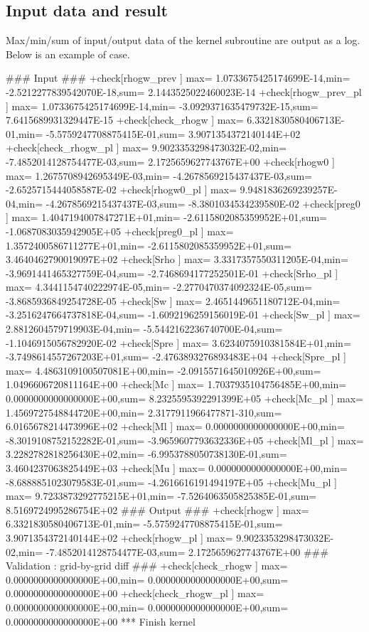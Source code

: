 \subsection{Input data and result}

Max/min/sum of input/output data of the kernel subroutine are output as
a log.
%
Below is an example of  case.


\begin{LstLog}
 ### Input ###
 +check[rhogw_prev      ] max=  1.0733675425174699E-14,min= -2.5212277839542070E-18,sum=  2.1443525022460023E-14
 +check[rhogw_prev_pl   ] max=  1.0733675425174699E-14,min= -3.0929371635479732E-15,sum=  7.6415689931329447E-15
 +check[check_rhogw     ] max=  6.3321830580406713E-01,min= -5.5759247708875415E-01,sum=  3.9071354372140144E+02
 +check[check_rhogw_pl  ] max=  9.9023353298473032E-02,min= -7.4852014128754477E-03,sum=  2.1725659627743767E+00
 +check[rhogw0          ] max=  1.2675708942695349E-03,min= -4.2678569215437437E-03,sum= -2.6525715444058587E-02
 +check[rhogw0_pl       ] max=  9.9481836269239257E-04,min= -4.2678569215437437E-03,sum= -8.3801034534239580E-02
 +check[preg0           ] max=  1.4047194007847271E+01,min= -2.6115802085359952E+01,sum= -1.0687083035942905E+05
 +check[preg0_pl        ] max=  1.3572400586711277E+01,min= -2.6115802085359952E+01,sum=  3.4640462790019097E+02
 +check[Srho            ] max=  3.3317357550311205E-04,min= -3.9691441465327759E-04,sum= -2.7468694177252501E-01
 +check[Srho_pl         ] max=  4.3441154740222974E-05,min= -2.2770470374092324E-05,sum= -3.8685936849254728E-05
 +check[Sw              ] max=  2.4651449651180712E-04,min= -3.2516247664737818E-04,sum= -1.6092196259156019E-01
 +check[Sw_pl           ] max=  2.8812604579719903E-04,min= -5.5442162236740700E-04,sum= -1.1046915056782920E-02
 +check[Spre            ] max=  3.6234075910381584E+01,min= -3.7498614557267203E+01,sum= -2.4763893276893483E+04
 +check[Spre_pl         ] max=  4.4863109100507081E+00,min= -2.0915571645010926E+00,sum=  1.0496606720811164E+00
 +check[Mc              ] max=  1.7037935104756485E+00,min=  0.0000000000000000E+00,sum=  8.2325595392291399E+05
 +check[Mc_pl           ] max=  1.4569727548844720E+00,min=  2.3177911966477871-310,sum=  6.0165678214473996E+02
 +check[Ml              ] max=  0.0000000000000000E+00,min= -8.3019108752152282E-01,sum= -3.9659607793632336E+05
 +check[Ml_pl           ] max=  3.2282782818256430E+02,min= -6.9953788050738130E-01,sum=  3.4604237063825449E+03
 +check[Mu              ] max=  0.0000000000000000E+00,min= -8.6888851023079583E-01,sum= -4.2616616191494197E+05
 +check[Mu_pl           ] max=  9.7233873292775215E+01,min= -7.5264063505825385E-01,sum=  8.5169724995286754E+02
 ### Output ###
 +check[rhogw           ] max=  6.3321830580406713E-01,min= -5.5759247708875415E-01,sum=  3.9071354372140144E+02
 +check[rhogw_pl        ] max=  9.9023353298473032E-02,min= -7.4852014128754477E-03,sum=  2.1725659627743767E+00
 ### Validation : grid-by-grid diff ###
 +check[check_rhogw     ] max=  0.0000000000000000E+00,min=  0.0000000000000000E+00,sum=  0.0000000000000000E+00
 +check[check_rhogw_pl  ] max=  0.0000000000000000E+00,min=  0.0000000000000000E+00,sum=  0.0000000000000000E+00
 *** Finish kernel
\end{LstLog}

